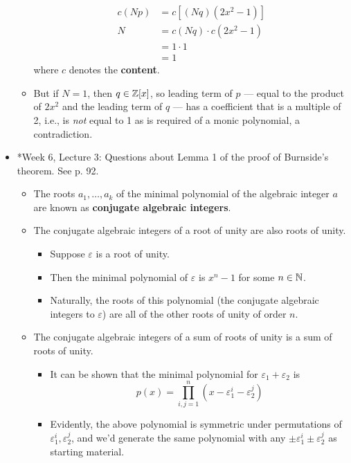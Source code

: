 \documentclass[../notes.tex]{subfiles}
\begin{document}
\begin{itemize}
\begin{itemize}
        \begin{align*}
            c(Np) &= c[(Nq)(2x^2-1)]\\
            N &= c(Nq)\cdot c(2x^2-1)\\
            &= 1\cdot 1\\
            &= 1
        \end{align*}
        where $c$ denotes the \textbf{content}.
        \item But if $N=1$, then $q\in\mathbb{Z}[x]$, so leading term of $p$ --- equal to the product of $2x^2$ and the leading term of $q$ --- has a coefficient that is a multiple of 2, i.e., is \emph{not} equal to 1 as is required of a monic polynomial, a contradiction.
    \end{itemize}
    \item *Week 6, Lecture 3: Questions about Lemma 1 of the proof of Burnside's theorem. See p. 92.
    \begin{itemize}
        \item The roots $a_1,\dots,a_k$ of the minimal polynomial of the algebraic integer $a$ are known as \textbf{conjugate algebraic integers}.
        \item The conjugate algebraic integers of a root of unity are also roots of unity.
        \begin{itemize}
            \item Suppose $\varepsilon$ is a root of unity.
            \item Then the minimal polynomial of $\varepsilon$ is $x^n-1$ for some $n\in\mathbb{N}$.
            \item Naturally, the roots of this polynomial (the conjugate algebraic integers to $\varepsilon$) are all of the other roots of unity of order $n$.
        \end{itemize}
        \item The conjugate algebraic integers of a sum of roots of unity is a sum of roots of unity.
        \begin{itemize}
            \item It can be shown that the minimal polynomial for $\varepsilon_1+\varepsilon_2$ is
            \begin{equation*}
                p(x) = \prod_{i,j=1}^n(x-\varepsilon_1^i-\varepsilon_2^j)
            \end{equation*}
            \item Evidently, the above polynomial is symmetric under permutations of $\varepsilon_1^i,\varepsilon_2^j$, and we'd generate the same polynomial with any $\pm\varepsilon_1^i\pm\varepsilon_2^j$ as starting material.

\end{itemize}
\end{itemize}
\end{itemize}
\end{document}
